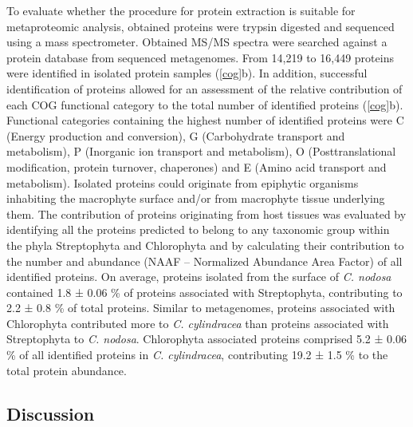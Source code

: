 \documentclass[12pt,]{article}
\begin{document}
To evaluate whether the procedure for protein extraction is suitable for
metaproteomic analysis, obtained proteins were trypsin digested and
sequenced using a mass spectrometer. Obtained MS/MS spectra were
searched against a protein database from sequenced metagenomes. From
14,219 to 16,449 proteins were identified in isolated protein samples
(\autoref{cog}b). In addition, successful identification of proteins
allowed for an assessment of the relative contribution of each COG
functional category to the total number of identified proteins
(\autoref{cog}b). Functional categories containing the highest number of
identified proteins were C (Energy production and conversion), G
(Carbohydrate transport and metabolism), P (Inorganic ion transport and
metabolism), O (Posttranslational modification, protein turnover,
chaperones) and E (Amino acid transport and metabolism). Isolated
proteins could originate from epiphytic organisms inhabiting the
macrophyte surface and/or from macrophyte tissue underlying them. The
contribution of proteins originating from host tissues was evaluated by
identifying all the proteins predicted to belong to any taxonomic group
within the phyla Streptophyta and Chlorophyta and by calculating their
contribution to the number and abundance (NAAF -- Normalized Abundance
Area Factor) of all identified proteins. On average, proteins isolated
from the surface of \emph{C. nodosa} contained 1.8 ± 0.06 \si{\percent}
of proteins associated with Streptophyta, contributing to 2.2 ± 0.8
\si{\percent} of total proteins. Similar to metagenomes, proteins
associated with Chlorophyta contributed more to \emph{C. cylindracea}
than proteins associated with Streptophyta to \emph{C. nodosa}.
Chlorophyta associated proteins comprised 5.2 ± 0.06 \si{\percent} of
all identified proteins in \emph{C. cylindracea}, contributing 19.2 ±
1.5 \si{\percent} to the total protein abundance.

\newpage

\hypertarget{discussion}{%
\subsection{Discussion}\label{discussion}}
\end{document}
